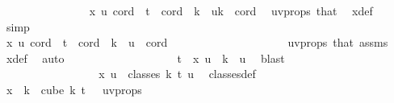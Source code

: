 \begin{isabellebody}
\ \ \ \ \ \ \ \ \ \ \ \ \ \ \isamarkupfalse%
\ {\isachardoublequoteopen}x\ u\ cord\ {\isacharequal}{\kern0pt}\ t{\isachardoublequoteclose}\ \ {\isachardoublequoteopen}cord\ {\isasymin}\ {\isacharbraceleft}{\kern0pt}k\ {\isacharminus}{\kern0pt}\ u{\isachardot}{\kern0pt}{\isachardot}{\kern0pt}{\isacharless}{\kern0pt}k{\isacharbraceright}{\kern0pt}{\isachardoublequoteclose}\ \ cord\ \isamarkupfalse%
\ uv{\isacharunderscore}{\kern0pt}props\ that\ \isamarkupfalse%
\ x{\isacharunderscore}{\kern0pt}def\ \isamarkupfalse%
\ simp\ \isanewline
\ \ \ \ \ \ \ \ \ \ \ \ \ \ \isamarkupfalse%
\ \isanewline
\ \ \ \ \ \ \ \ \ \ \ \ \ \ \isacommand{{\isacharbraceleft}{\kern0pt}}\isamarkupfalse%
\ \ \isanewline
\ \ \ \ \ \ \ \ \ \ \ \ \ \ \ \ \isamarkupfalse%
\ {\isachardoublequoteopen}x\ u\ cord\ {\isasymnoteq}\ t{\isachardoublequoteclose}\ \ {\isachardoublequoteopen}cord\ {\isasymin}\ {\isacharbraceleft}{\kern0pt}{\isachardot}{\kern0pt}{\isachardot}{\kern0pt}{\isacharless}{\kern0pt}k\ {\isacharminus}{\kern0pt}\ u{\isacharbraceright}{\kern0pt}{\isachardoublequoteclose}\ \ cord\ \isanewline
\ \ \ \ \ \ \ \ \ \ \ \ \ \ \ \ \ \ \isamarkupfalse%
\ uv{\isacharunderscore}{\kern0pt}props\ that\ assms{\isacharparenleft}{\kern0pt}{}{\isacharparenright}{\kern0pt}\ \isamarkupfalse%
\ x{\isacharunderscore}{\kern0pt}def\ \isamarkupfalse%
\ auto\isanewline
\ \ \ \ \ \ \ \ \ \ \ \ \ \ \ \ \isamarkupfalse%
\ \isamarkupfalse%
\ {\isachardoublequoteopen}t\ {\isasymnotin}\ x\ u\ {\isacharbackquote}{\kern0pt}\ {\isacharbraceleft}{\kern0pt}{\isachardot}{\kern0pt}{\isachardot}{\kern0pt}{\isacharless}{\kern0pt}k\ {\isacharminus}{\kern0pt}\ u{\isacharbraceright}{\kern0pt}{\isachardoublequoteclose}\ \isamarkupfalse%
\ blast\isanewline
\ \ \ \ \ \ \ \ \ \ \ \ \ \ \isacommand{{\isacharbraceright}{\kern0pt}}\isamarkupfalse%
\isanewline
\ \ \ \ \ \ \ \ \ \ \ \ \ \ \isamarkupfalse%
\ \isamarkupfalse%
\ {\isachardoublequoteopen}x\ u\ {\isasymin}\ classes\ k\ t\ u{\isachardoublequoteclose}\ \isamarkupfalse%
\ classes{\isacharunderscore}{\kern0pt}def\ \isanewline
\ \ \ \ \ \ \ \ \ \ \ \ \ \ \ \ \isamarkupfalse%
\ {\isacartoucheopen}x\ {\isacharbackquote}{\kern0pt}\ {\isacharbraceleft}{\kern0pt}{\isachardot}{\kern0pt}{\isachardot}{\kern0pt}k{\isacharbraceright}{\kern0pt}\ {\isasymsubseteq}\ cube\ k\ {\isacharparenleft}{\kern0pt}t\ {\isacharplus}{\kern0pt}\ {}{\isacharparenright}{\kern0pt}{\isacartoucheclose}\ uv{\isacharunderscore}{\kern0pt}props\ \isamarkupfalse%

\end{isabellebody}

